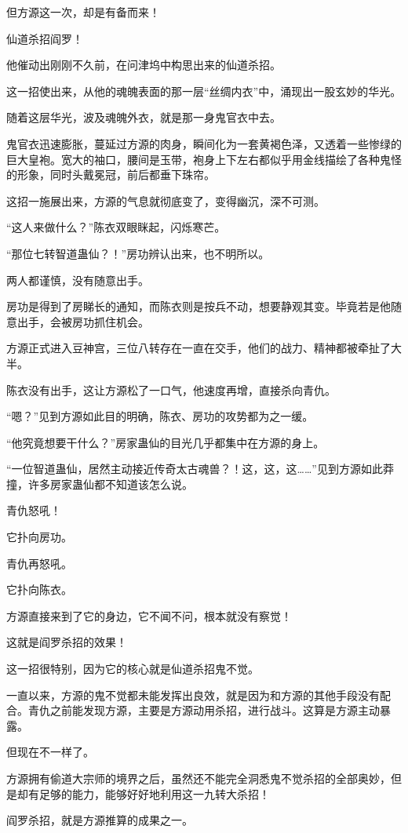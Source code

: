 \begin{this_body}
但方源这一次，却是有备而来！

仙道杀招阎罗！

他催动出刚刚不久前，在问津坞中构思出来的仙道杀招。

这一招使出来，从他的魂魄表面的那一层“丝绸内衣”中，涌现出一股玄妙的华光。

随着这层华光，波及魂魄外衣，就是那一身鬼官衣中去。

鬼官衣迅速膨胀，蔓延过方源的肉身，瞬间化为一套黄褐色泽，又透着一些惨绿的巨大皇袍。宽大的袖口，腰间是玉带，袍身上下左右都似乎用金线描绘了各种鬼怪的形象，同时头戴冕冠，前后都垂下珠帘。

这招一施展出来，方源的气息就彻底变了，变得幽沉，深不可测。

“这人来做什么？”陈衣双眼眯起，闪烁寒芒。

“那位七转智道蛊仙？！”房功辨认出来，也不明所以。

两人都谨慎，没有随意出手。

房功是得到了房睇长的通知，而陈衣则是按兵不动，想要静观其变。毕竟若是他随意出手，会被房功抓住机会。

方源正式进入豆神宫，三位八转存在一直在交手，他们的战力、精神都被牵扯了大半。

陈衣没有出手，这让方源松了一口气，他速度再增，直接杀向青仇。

“嗯？”见到方源如此目的明确，陈衣、房功的攻势都为之一缓。

“他究竟想要干什么？”房家蛊仙的目光几乎都集中在方源的身上。

“一位智道蛊仙，居然主动接近传奇太古魂兽？！这，这，这……”见到方源如此莽撞，许多房家蛊仙都不知道该怎么说。

青仇怒吼！

它扑向房功。

青仇再怒吼。

它扑向陈衣。

方源直接来到了它的身边，它不闻不问，根本就没有察觉！

这就是阎罗杀招的效果！

这一招很特别，因为它的核心就是仙道杀招鬼不觉。

一直以来，方源的鬼不觉都未能发挥出良效，就是因为和方源的其他手段没有配合。青仇之前能发现方源，主要是方源动用杀招，进行战斗。这算是方源主动暴露。

但现在不一样了。

方源拥有偷道大宗师的境界之后，虽然还不能完全洞悉鬼不觉杀招的全部奥妙，但是却有足够的能力，能够好好地利用这一九转大杀招！

阎罗杀招，就是方源推算的成果之一。


\end{this_body}
